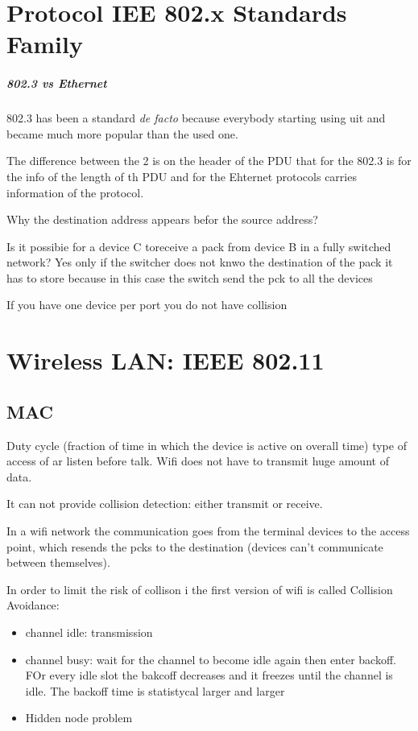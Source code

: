 \chapter{Protocol IEE 802.x Standards Family}

\paragraph{802.3 vs Ethernet} 
802.3 has been a standard \emph{de facto} because everybody starting using uit and became much more popular than the used one. 

The difference between the 2 is on the header of the PDU that for the 802.3 is for the info of the length of th PDU and for the Ehternet protocols carries information of the protocol. 

Why the destination address appears befor the source address?

Is it possibie for a device C toreceive a pack from device B in a fully switched network? Yes only if the switcher does not knwo the destination of the pack it has to store because in this case the switch send the pck to all the devices 

If you have one device per port you do not have collision 

\chapter{Wireless LAN: IEEE 802.11}
\section{MAC}
Duty cycle (fraction of time in which the device is active on overall time) type of access of ar listen before talk. 
Wifi does not have to transmit huge amount of data.

It can not provide collision detection: either transmit or receive.

In a wifi network the communication goes from the terminal devices to the access point, which resends the pcks to the destination (devices can't communicate between themselves). 

In order to limit the risk of collison i the first version of wifi is called Collision Avoidance:
\begin{itemize}
\item channel idle: transmission
\item channel busy: wait for the channel to become idle again then enter backoff. FOr every idle slot the bakcoff decreases and it freezes until the channel is idle. The backoff time is statistycal larger and larger 
\item Hidden node problem 
\end{itemize}

